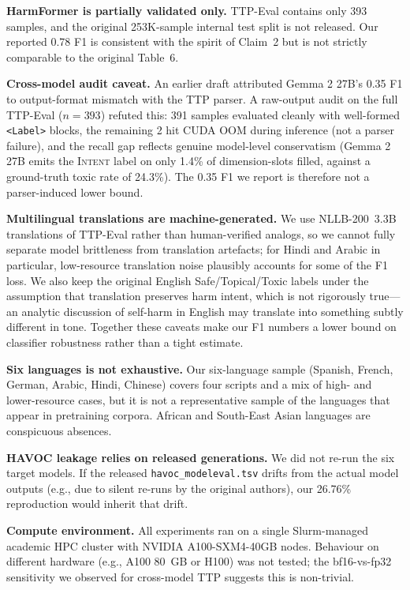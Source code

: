 \documentclass[10pt]{article} %
\begin{document}
\textbf{HarmFormer is partially validated only.} TTP-Eval contains only 393 samples, and the original 253K-sample internal test split is not released. Our reported 0.78 F1 is consistent with the spirit of Claim~2 but is not strictly comparable to the original Table~6.

\textbf{Cross-model audit caveat.} An earlier draft attributed Gemma 2 27B's 0.35 F1 to output-format mismatch with the TTP parser. A raw-output audit on the full TTP-Eval ($n=393$) refuted this: 391 samples evaluated cleanly with well-formed \texttt{<Label>} blocks, the remaining 2 hit CUDA OOM during inference (not a parser failure), and the recall gap reflects genuine model-level conservatism (Gemma 2 27B emits the \textsc{Intent} label on only 1.4\% of dimension-slots filled, against a ground-truth toxic rate of 24.3\%). The 0.35 F1 we report is therefore not a parser-induced lower bound.

\textbf{Multilingual translations are machine-generated.} We use NLLB-200~3.3B translations of TTP-Eval rather than human-verified analogs, so we cannot fully separate model brittleness from translation artefacts; for Hindi and Arabic in particular, low-resource translation noise plausibly accounts for some of the F1 loss. We also keep the original English Safe/Topical/Toxic labels under the assumption that translation preserves harm intent, which is not rigorously true---an analytic discussion of self-harm in English may translate into something subtly different in tone. Together these caveats make our F1 numbers a lower bound on classifier robustness rather than a tight estimate.

\textbf{Six languages is not exhaustive.} Our six-language sample (Spanish, French, German, Arabic, Hindi, Chinese) covers four scripts and a mix of high- and lower-resource cases, but it is not a representative sample of the languages that appear in pretraining corpora. African and South-East Asian languages are conspicuous absences.

\textbf{HAVOC leakage relies on released generations.} We did not re-run the six target models. If the released \texttt{havoc\_modeleval.tsv} drifts from the actual model outputs (e.g., due to silent re-runs by the original authors), our 26.76\% reproduction would inherit that drift.

\textbf{Compute environment.} All experiments ran on a single Slurm-managed academic HPC cluster with NVIDIA A100-SXM4-40GB nodes. Behaviour on different hardware (e.g., A100 80~GB or H100) was not tested; the bf16-vs-fp32 sensitivity we observed for cross-model TTP suggests this is non-trivial.
\end{document}

